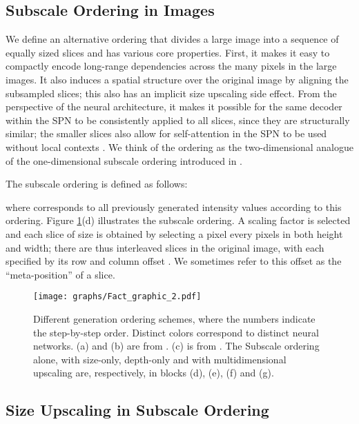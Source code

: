 \documentclass{article} \usepackage{iclr2019_conference,times}
\begin{document}
\subsection{Subscale Ordering in Images}
\label{Subs}

We define an alternative ordering that divides a large image into a sequence of equally sized slices and has various core properties. First, it makes it easy to compactly encode long-range dependencies across the many pixels in the large images. It also induces a spatial structure over the original image by aligning the subsampled slices; this also has an implicit size upscaling side effect. From the perspective of the neural architecture, it makes it possible for the same decoder within the SPN to be consistently applied to all slices, since they are structurally similar; the smaller slices also allow for self-attention \citep{Vaswani17} in the SPN to be used without local contexts \citep{Parmar18}. We think of the ordering as the two-dimensional analogue of the one-dimensional subscale ordering introduced in \citet{WaveRNN}.

The subscale ordering is defined as follows:

where  corresponds to all previously generated intensity values according to this ordering. Figure \ref{fig:OrderingDiagram}(d) illustrates the subscale ordering. A scaling factor  is selected and each slice of size  is obtained by selecting a pixel every  pixels in both height and width; there are thus  interleaved slices in the original image, with each specified  by its row and column offset . We sometimes refer to this offset as the ``meta-position'' of a slice.

\begin{figure}
 \centering
 \texttt{[image: graphs/Fact\_graphic\_2.pdf]}
 \caption{Different generation ordering schemes, where the numbers indicate the step-by-step order. Distinct colors correspond to distinct neural networks. (a) and (b) are from \citep{PixelRNN}. (c) is from \citep{ParallelMultiscale}. The Subscale ordering alone, with size-only, depth-only and with multidimensional upscaling are, respectively, in blocks (d), (e), (f) and (g).}
 \label{fig:OrderingDiagram}
 \end{figure}

\subsection{Size Upscaling in Subscale Ordering}
\end{document}
